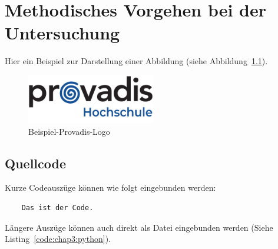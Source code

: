 %

\chapter{Methodisches Vorgehen bei der Untersuchung}

Hier ein Beispiel zur Darstellung einer Abbildung (siehe Abbildung~\ref{fig:chap3:provadis}).

\begin{figure}[htb]
    \centering
    \includegraphics[width=0.5\textwidth]{Bilder/Deckblatt/provadis-hochschule.pdf}
    \caption{Beispiel-Provadis-Logo}
    \label{fig:chap3:provadis}
\end{figure}

\section{Quellcode}
Kurze Codeauszüge können wie folgt eingebunden werden:

\begin{lstlisting}
    Das ist der Code.
\end{lstlisting}

Längere Auszüge können auch direkt als Datei eingebunden werden (Siehe Listing~\ref{code:chap3:python}).


